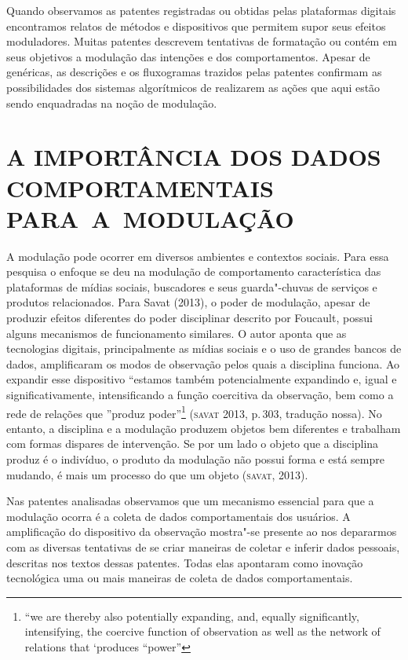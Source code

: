 Quando observamos as patentes registradas ou obtidas pelas plataformas
digitais encontramos relatos de métodos e dispositivos que permitem
supor seus efeitos moduladores. Muitas patentes descrevem tentativas de
formatação ou contém em seus objetivos a modulação das intenções e dos
comportamentos. Apesar de genéricas, as descrições e os fluxogramas
trazidos pelas patentes confirmam as possibilidades dos sistemas
algorítmicos de realizarem as ações que aqui estão sendo enquadradas na
noção de modulação.

\section{A IMPORTÂNCIA DOS DADOS COMPORTAMENTAIS PARA~A~MODULAÇÃO}

A modulação pode ocorrer em diversos ambientes e contextos sociais. Para
essa pesquisa o enfoque se deu na modulação de comportamento
característica das plataformas de mídias sociais, buscadores e seus
guarda"-chuvas de serviços e produtos relacionados. Para Savat (2013), o
poder de modulação, apesar de produzir efeitos diferentes do poder
disciplinar descrito por Foucault, possui alguns mecanismos de
funcionamento similares. O autor aponta que as tecnologias digitais,
principalmente as mídias sociais e o uso de grandes bancos de dados,
amplificaram os modos de observação pelos quais a disciplina funciona.
Ao expandir esse dispositivo ``estamos também potencialmente expandindo
e, igual e significativamente, intensificando a função coercitiva da
observação, bem como a rede de relações que ''produz poder''\footnote{``we
  are thereby also potentially expanding, and, equally significantly,
  intensifying, the coercive function of observation as well as the
  network of relations that `produces ``power''} (\textsc{savat} 2013, p.\,303,
tradução nossa). No entanto, a disciplina e a modulação produzem objetos
bem diferentes e trabalham com formas dispares de intervenção. Se por um
lado o objeto que a disciplina produz é o indivíduo, o produto da
modulação não possui forma e está sempre mudando, é mais um processo do
que um objeto (\textsc{savat}, 2013).

Nas patentes analisadas observamos que um mecanismo essencial para que a
modulação ocorra é a coleta de dados comportamentais dos usuários. A
amplificação do dispositivo da observação mostra"-se presente ao nos
depararmos com as diversas tentativas de se criar maneiras de coletar e
inferir dados pessoais, descritas nos textos dessas patentes. Todas elas
apontaram como inovação tecnológica uma ou mais maneiras de coleta de
dados comportamentais.

